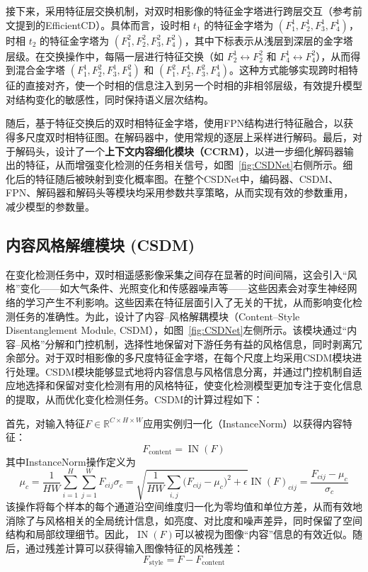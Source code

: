 接下来，采用特征层交换机制，对双时相影像的特征金字塔进行跨层交互（参考前文提到的EfficientCD）。具体而言，设时相 $t_1$ 的特征金字塔为 $(F^1_1, F^1_2, F^1_3, F^1_4)$，时相 $t_2$ 的特征金字塔为 $(F^2_1, F^2_2, F^2_3, F^2_4)$，其中下标表示从浅层到深层的金字塔层级。在交换操作中，每隔一层进行特征交换（如 $F^1_2 \leftrightarrow F^2_2$ 和 $F^1_4 \leftrightarrow F^2_4$），从而得到混合金字塔 $(F^1_1, F^2_2, F^1_3, F^2_4)$ 和 $(F^2_1, F^1_2, F^2_3, F^1_4)$。这种方式能够实现跨时相特征的直接对齐，使一个时相的信息注入到另一个时相的非相邻层级，有效提升模型对结构变化的敏感性，同时保持语义层次结构。

随后，基于特征交换后的双时相特征金字塔，使用FPN结构进行特征融合，以获得多尺度双时相特征图。在解码器中，使用常规的逐层上采样进行解码。最后，对于解码头，设计了一个\textbf{上下文内容细化模块（CCRM）}，以进一步细化解码器输出的特征，从而增强变化检测的任务相关信号，如图~\ref{fig:CSDNet}右侧所示。细化后的特征随后被映射到变化概率图。在整个CSDNet中，编码器、CSDM、FPN、解码器和解码头等模块均采用参数共享策略，从而实现有效的参数重用，减少模型的参数量。


\subsection{内容风格解缠模块 (CSDM)}
在变化检测任务中，双时相遥感影像采集之间存在显著的时间间隔，这会引入“风格”变化——如大气条件、光照变化和传感器噪声等——这些因素会对孪生神经网络的学习产生不利影响。这些因素在特征层面引入了无关的干扰，从而影响变化检测任务的准确性。为此，设计了内容–风格解耦模块（Content–Style Disentanglement Module, CSDM），如图~\ref{fig:CSDNet}左侧所示。该模块通过“内容–风格”分解和门控机制，选择性地保留对下游任务有益的风格信息，同时剥离冗余部分。对于双时相影像的多尺度特征金字塔，在每个尺度上均采用CSDM模块进行处理。CSDM模块能够显式地将内容信息与风格信息分离，并通过门控机制自适应地选择和保留对变化检测有用的风格特征，使变化检测模型更加专注于变化信息的提取，从而优化变化检测任务。CSDM的计算过程如下：

首先，对输入特征$F\in\mathbb{R}^{C\times H\times W}$应用实例归一化（InstanceNorm）以获得内容特征：
\begin{equation}\label{eq:content}
F_{\mathrm{content}} = \operatorname{IN}(F)
\end{equation}
其中InstanceNorm操作定义为
\begin{equation}
\mu_c = \frac{1}{HW}\sum_{i=1}^{H}\sum_{j=1}^{W}F_{cij}
\sigma_c = \sqrt{\frac{1}{HW}\sum_{i,j}\bigl(F_{cij}-\mu_c\bigr)^2+\epsilon}
\operatorname{IN}(F)_{cij}=\frac{F_{cij}-\mu_c}{\sigma_c}
\end{equation}
该操作将每个样本的每个通道沿空间维度归一化为零均值和单位方差，从而有效地消除了与风格相关的全局统计信息，如亮度、对比度和噪声差异，同时保留了空间结构和局部纹理细节。因此，$\operatorname{IN}(F)$可以被视为图像“内容”信息的有效近似。随后，通过残差计算可以获得输入图像特征的风格残差：
\begin{equation}
F_{\mathrm{style}} = F - F_{\mathrm{content}}
\end{equation}

